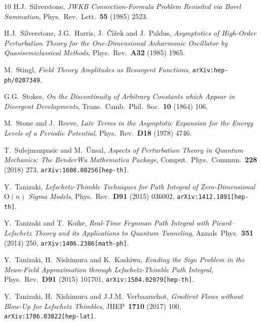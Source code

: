\documentclass[11pt,a4paper]{article}
\begin{document}
\begin{thebibliography}{10}
H.J.~Silverstone,
\textit{JWKB Connection-Formula Problem Revisited via Borel Summation},
Phys.\ Rev.\ Lett.\ \textbf{55} (1985) 2523.

H.J.~Silverstone, J.G.~Harris, J.~\v{C}\'\i\v{z}ek and J.~Paldus,
\textit{Asymptotics of High-Order Perturbation Theory for the One-Dimensional Anharmonic Oscillator by Quasisemiclassical Methods},
Phys.\ Rev.\ \textbf{A32} (1985) 1965.

M.~Stingl,
\textit{Field Theory Amplitudes as Resurgent Functions},
\texttt{arXiv:hep-ph/0207349}.

G.G.~Stokes,
\textit{On the Discontinuity of Arbitrary Constants which Appear in Divergent Developments},
Trans.\ Camb.\ Phil.\ Soc.\ \textbf{10} (1864) 106.

M.~Stone and J.~Reeve,
\textit{Late Terms in the Asymptotic Expansion for the Energy Levels of a Periodic Potential},
Phys.\ Rev.\ \textbf{D18} (1978) 4746.

T.~Sulejmanpasic and M.~\"Unsal,
\textit{Aspects of Perturbation Theory in Quantum Mechanics: The BenderWu Mathematica Package},
Comput.\ Phys.\ Commun.\ \textbf{228} (2018) 273,
\texttt{arXiv:1608.08256[hep-th]}.

Y.~Tanizaki,
\textit{Lefschetz-Thimble Techniques for Path Integral of Zero-Dimensional $\text{O}(n)$ Sigma Models},
Phys.\ Rev.\ \textbf{D91} (2015) 036002,
\texttt{arXiv:1412.1891[hep-th]}.

Y.~Tanizaki and T.~Koike,
\textit{Real-Time Feynman Path Integral with Picard--Lefschetz Theory and its Applications to Quantum Tunneling},
Annals\ Phys.\ \textbf{351} (2014) 250,
\texttt{arXiv:1406.2386[math-ph]}.

Y.~Tanizaki, H.~Nishimura and K.~Kashiwa,
\textit{Evading the Sign Problem in the Mean-Field Approximation through Lefschetz-Thimble Path Integral},
Phys.\ Rev.\ \textbf{D91} (2015) 101701,
\texttt{arXiv:1504.02979[hep-th]}.

Y.~Tanizaki, H.~Nishimura and J.J.M.~Verbaarschot,
\textit{Gradient Flows without Blow-Up for Lefschetz Thimbles},
JHEP\ \textbf{1710} (2017) 100,
\texttt{arXiv:1706.03822[hep-lat]}.


\end{thebibliography}
\end{document}
